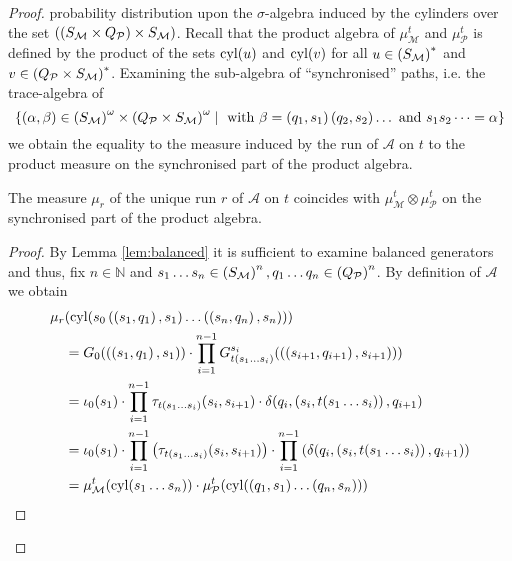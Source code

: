\begin{proof}
probability distribution upon the $\sigma$-algebra induced by the cylinders
over the set $\left(\left(S_{\mathcal{M}}\times Q_{\mathcal{P}}\right)\times
S_{\mathcal{M}}\right)$. Recall that the product algebra of
$\mu_{\mathcal{M}}^{t}$ and $\mu_{\mathcal{P}}^{t}$ is defined by the product
of the sets $\operatorname{cyl}(u)$ and $\operatorname{cyl}(v)$ for all $u\in\left(S_{\mathcal{M}}\right)^{*}$
and $v\in\left(Q_{\mathcal{P}}\times S_{\mathcal{M}}\right)^{*}$. Examining the
sub-algebra of \enquote{synchronised} paths, i.e. the trace-algebra of
\begin{equation*}
  \left\{\left(\alpha,\beta\right)\in \left(S_{\mathcal{M}}\right)^{\omega}\times
  \left(Q_{\mathcal{P}}\times S_{\mathcal{M}}\right)^{\omega}\mid\text{ with }
  \beta = \left(q_{1}, s_{1}\right)\left(q_{2}, s_{2}\right)\dots\text{ and }
  s_{1}s_{2}\dots = \alpha\right\}
\end{equation*}
we obtain the equality to the measure induced by the run of $\mathcal{A}$ on
$t$ to the product measure on the synchronised part of the product algebra.
\begin{lemma}
  The measure $\mu_{r}$ of the unique run $r$ of $\mathcal{A}$ on $t$ coincides
  with $\mu_{\mathcal{M}}^{t}\otimes\mu_{\mathcal{P}}^{t}$ on the synchronised
  part of the product algebra.
  \label{lem:productmeasure}
\end{lemma}
\begin{proof}
  By Lemma \ref{lem:balanced} it is sufficient to examine balanced generators
  and thus, fix $n\in\mathbb{N}$ and $s_{1}\dots s_{n}
  \in\left(S_{\mathcal{M}}\right)^{n},
  q_{1}\dots q_{n}\in\left(Q_{\mathcal{P}}\right)^{n}$. By definition of
  $\mathcal{A}$ we obtain
  \begin{align*}
    \mu_{r}&(\cyl(s_{0}\tuple{\tuple{s_{1},q_{1}}, s_{1}}\dots\tuple{\tuple{s_{n},q_{n}}, s_{n}}))\\
    &= G_{0}(\tuple{\tuple{s_{1},q_{1}}, s_{1}})\cdot\prod\limits_{i = 1}^{n-1}
    G^{s_{i}}_{t(s_{1}\dots s_{i})}(\tuple{\tuple{s_{i+1},q_{i+1}}, s_{i+1}}))\\
    &=\iota_{0}(s_{1})\cdot\prod\limits_{i = 1}^{n-1}
    \tau_{t(s_{1}\dots s_{i})}(s_{i}, s_{i+1})\cdot
    \delta(q_{i}, \tuple{s_{i}, t(s_{1}\dots s_{i})}, q_{i+1})\\
    &=\iota_{0}(s_{1})\cdot\prod\limits_{i = 1}^{n-1}\tuple{
      \tau_{t(s_{1}\dots s_{i})}(s_{i}, s_{i+1})}
    \cdot\prod\limits_{i = 1}^{n-1}\tuple{
      \delta(q_{i}, \tuple{s_{i}, t(s_{1}\dots s_{i})}, q_{i+1})}\\
    &=\mu_{\mathcal{M}}^{t}(\cyl(s_{1}\dots s_{n}))\cdot
      \mu_{\mathcal{P}}^{t}(\cyl(\tuple{q_{1},s_{1}}\dots\tuple{q_{n},s_{n}}))

\end{align*}
\end{proof}
\end{proof}
